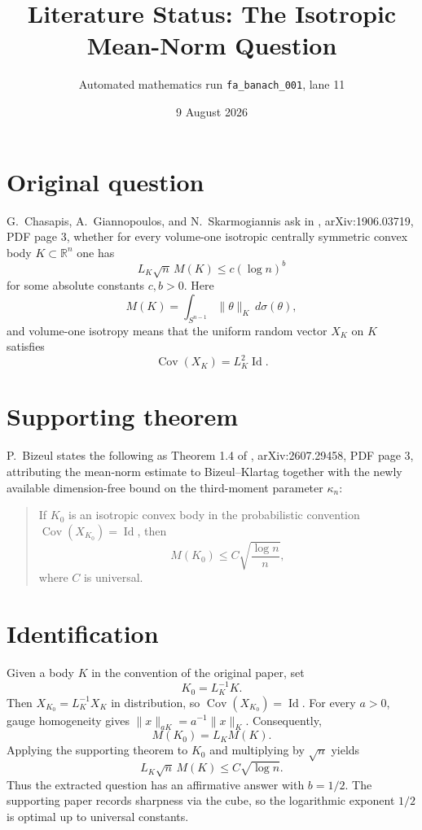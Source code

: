 \documentclass[11pt]{article}
\title{Literature Status: The Isotropic Mean-Norm Question}
\author{Automated mathematics run \texttt{fa\_banach\_001}, lane 11}
\date{9 August 2026}
\begin{document}
\maketitle

\begin{center}
\end{center}

\section*{Original question}

G.~Chasapis, A.~Giannopoulos, and N.~Skarmogiannis ask in
\cite{CGS2019}, arXiv:1906.03719, PDF page 3, whether for every volume-one
isotropic centrally symmetric convex body $K\subset\mathbb R^n$ one has
\[
  L_K\sqrt n\,M(K)\le c(\log n)^b
\]
for some absolute constants $c,b>0$.  Here
\[
  M(K)=\int_{S^{n-1}}\|\theta\|_K\,d\sigma(\theta),
\]
and volume-one isotropy means that the uniform random vector $X_K$ on $K$
satisfies
\[
  \operatorname{Cov}(X_K)=L_K^2\operatorname{Id}.
\]

\section*{Supporting theorem}

P.~Bizeul states the following as Theorem 1.4 of
\cite{Bizeul2026}, arXiv:2607.29458, PDF page 3, attributing the mean-norm
estimate to Bizeul--Klartag together with the newly available dimension-free
bound on the third-moment parameter $\kappa_n$:
\begin{quote}
If $K_0$ is an isotropic convex body in the probabilistic convention
$\operatorname{Cov}(X_{K_0})=\operatorname{Id}$, then
\[
  M(K_0)\le C\sqrt{\frac{\log n}{n}},
\]
where $C$ is universal.
\end{quote}

\section*{Identification}

Given a body $K$ in the convention of the original paper, set
\[
  K_0=L_K^{-1}K.
\]
Then $X_{K_0}=L_K^{-1}X_K$ in distribution, so
$\operatorname{Cov}(X_{K_0})=\operatorname{Id}$.  For every $a>0$, gauge
homogeneity gives $\|x\|_{aK}=a^{-1}\|x\|_K$.  Consequently,
\[
  M(K_0)=L_K M(K).
\]
Applying the supporting theorem to $K_0$ and multiplying by $\sqrt n$ yields
\[
  \boxed{L_K\sqrt n\,M(K)\le C\sqrt{\log n}.}
\]
Thus the extracted question has an affirmative answer with $b=1/2$.  The
supporting paper records sharpness via the cube, so the logarithmic exponent
$1/2$ is optimal up to universal constants.
\end{document}
